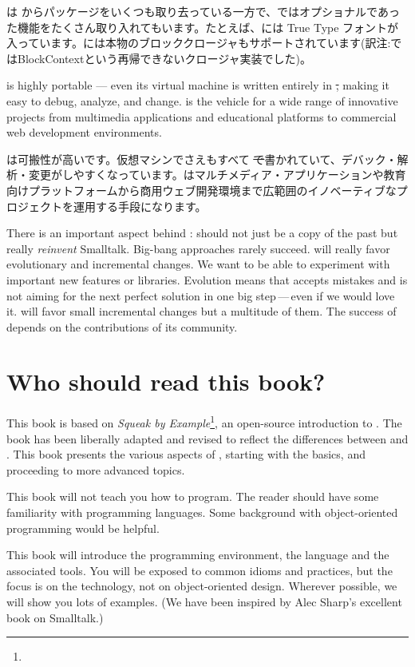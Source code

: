 \documentclass[a4paper,10pt,twoside]{book}
\begin{document}
\pharo は \squeak からパッケージをいくつも取り去っている一方で、\squeak ではオプショナルであった機能をたくさん取り入れてもいます。たとえば、\pharo には True Type フォントが入っています。\pharo には本物のブロッククロージャもサポートされています(訳注:\squeak ではBlockContextという再帰できないクロージャ実装でした)。

\pharo is highly portable --- even its virtual machine is written entirely in \st, making it easy to debug, analyze, and change. \pharo is the vehicle for a wide range of innovative projects from multimedia applications and educational platforms to commercial web development environments. 

\pharo は可搬性が高いです。仮想マシンでさえもすべて \st で書かれていて、デバック・解析・変更がしやすくなっています。\pharo はマルチメディア・アプリケーションや教育向けプラットフォームから商用ウェブ開発環境まで広範囲のイノベーティブなプロジェクトを運用する手段になります。

There is an important aspect behind \pharo: \pharo should not just be a copy of the past but really \emph{reinvent} Smalltalk. Big-bang approaches rarely succeed. \pharo will really favor evolutionary and incremental changes. We want to be able to experiment with important new features or libraries. Evolution means that \pharo accepts mistakes and is not aiming for the next perfect solution in one big step\,---\,even if we would love it. \pharo will favor small incremental changes but a multitude of them. The success of \pharo depends on the contributions of its community.

\section*{Who should read this book?}

This book is based on \emph{Squeak by Example}\footnote{\sbe}, an open-source introduction to \squeak.
The book has been liberally adapted and revised to reflect the differences between \pharo and \squeak.
This book presents the various aspects of \pharo, starting with the basics, and proceeding to more advanced topics.

This book will not teach you how to program. The reader should have some familiarity with programming languages. Some background with object-oriented programming would be helpful.

This book will introduce the \pharo programming environment, the language and the associated tools.  You will be exposed to common idioms and practices, but the focus is on the technology, not on object-oriented design. Wherever possible, we will show you lots of examples. (We have been inspired by Alec Sharp's excellent book on Smalltalk\cite{Shar97a}.)
\end{document}
